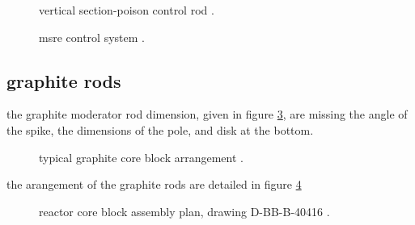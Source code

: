 \documentclass{article}
\begin{document}
\begin{preview}
\begin{figure}[H]
  \centering
  \caption{vertical section-poison control rod \parencite[figure 14b]{ad-cf-61-2-46}.}
  \label{61246-fig14b}
\end{figure}

\begin{figure}[H]
  \centering
  \caption{msre control system \parencite[figure 14c]{ad-cf-61-2-46}.}
  \label{61246-fig14c}
\end{figure}


\subsection{graphite rods}
the graphite moderator rod dimension, given in figure \ref{3229-fig2}, are missing the angle of the spike, the dimensions of the pole, and disk at the bottom.
\begin{figure}[H]
  \centering
  \centering
  \caption{typical graphite core block arrangement \parencite[figure 2]{ornl-tm-3229}.}
  \label{3229-fig2}
\end{figure}

the arangement of the graphite rods are detailed in figure \ref{4174-p10-p11}
\begin{figure}[H]
  \centering
  \caption{reactor core block assembly plan, drawing D-BB-B-40416 \parencite[page 10-11]{ornl-tm-4174}.}
  \label{4174-p10-p11}
\end{figure}


\printbibliography

\end{preview}
\end{document}

